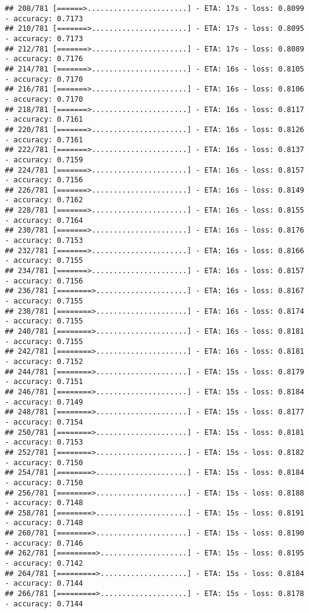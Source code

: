 \documentclass[
]{article}
\begin{document}
\begin{verbatim}
## 208/781 [======>.......................] - ETA: 17s - loss: 0.8099 - accuracy: 0.7173
## 210/781 [=======>......................] - ETA: 17s - loss: 0.8095 - accuracy: 0.7173
## 212/781 [=======>......................] - ETA: 17s - loss: 0.8089 - accuracy: 0.7176
## 214/781 [=======>......................] - ETA: 16s - loss: 0.8105 - accuracy: 0.7170
## 216/781 [=======>......................] - ETA: 16s - loss: 0.8106 - accuracy: 0.7170
## 218/781 [=======>......................] - ETA: 16s - loss: 0.8117 - accuracy: 0.7161
## 220/781 [=======>......................] - ETA: 16s - loss: 0.8126 - accuracy: 0.7161
## 222/781 [=======>......................] - ETA: 16s - loss: 0.8137 - accuracy: 0.7159
## 224/781 [=======>......................] - ETA: 16s - loss: 0.8157 - accuracy: 0.7156
## 226/781 [=======>......................] - ETA: 16s - loss: 0.8149 - accuracy: 0.7162
## 228/781 [=======>......................] - ETA: 16s - loss: 0.8155 - accuracy: 0.7164
## 230/781 [=======>......................] - ETA: 16s - loss: 0.8176 - accuracy: 0.7153
## 232/781 [=======>......................] - ETA: 16s - loss: 0.8166 - accuracy: 0.7155
## 234/781 [=======>......................] - ETA: 16s - loss: 0.8157 - accuracy: 0.7156
## 236/781 [========>.....................] - ETA: 16s - loss: 0.8167 - accuracy: 0.7155
## 238/781 [========>.....................] - ETA: 16s - loss: 0.8174 - accuracy: 0.7155
## 240/781 [========>.....................] - ETA: 16s - loss: 0.8181 - accuracy: 0.7155
## 242/781 [========>.....................] - ETA: 16s - loss: 0.8181 - accuracy: 0.7152
## 244/781 [========>.....................] - ETA: 15s - loss: 0.8179 - accuracy: 0.7151
## 246/781 [========>.....................] - ETA: 15s - loss: 0.8184 - accuracy: 0.7149
## 248/781 [========>.....................] - ETA: 15s - loss: 0.8177 - accuracy: 0.7154
## 250/781 [========>.....................] - ETA: 15s - loss: 0.8181 - accuracy: 0.7153
## 252/781 [========>.....................] - ETA: 15s - loss: 0.8182 - accuracy: 0.7150
## 254/781 [========>.....................] - ETA: 15s - loss: 0.8184 - accuracy: 0.7150
## 256/781 [========>.....................] - ETA: 15s - loss: 0.8188 - accuracy: 0.7148
## 258/781 [========>.....................] - ETA: 15s - loss: 0.8191 - accuracy: 0.7148
## 260/781 [========>.....................] - ETA: 15s - loss: 0.8190 - accuracy: 0.7146
## 262/781 [=========>....................] - ETA: 15s - loss: 0.8195 - accuracy: 0.7142
## 264/781 [=========>....................] - ETA: 15s - loss: 0.8184 - accuracy: 0.7144
## 266/781 [=========>....................] - ETA: 15s - loss: 0.8178 - accuracy: 0.7144

\end{verbatim}
\end{document}
